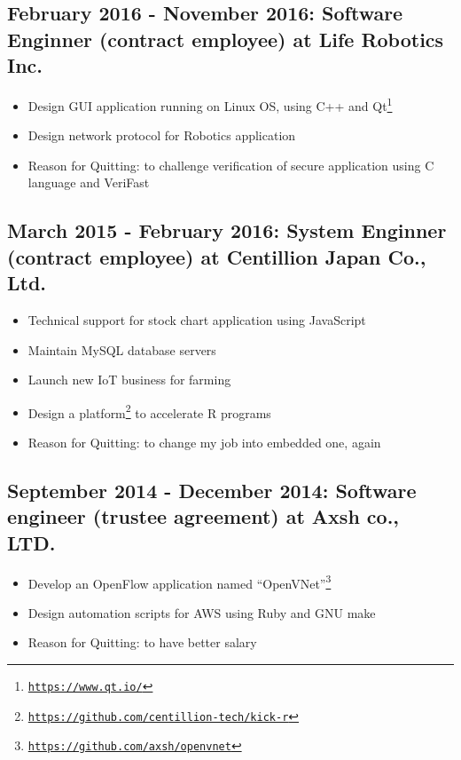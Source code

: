 \documentclass[letterpaper]{article}
\begin{document}
\subsection*{February 2016 - November 2016: Software Enginner (contract employee) at Life Robotics Inc.}

\begin{itemize}
  \item Design GUI application running on Linux OS, using C++ and Qt\footnote{\href{https://www.qt.io/}{\tt https://www.qt.io/}}
  \item Design network protocol for Robotics application
  \item Reason for Quitting: to challenge verification of secure application using C language and VeriFast
\end{itemize}

\subsection*{March 2015 - February 2016: System Enginner (contract employee) at Centillion Japan Co., Ltd.}

\begin{itemize}
  \item Technical support for stock chart application using JavaScript
  \item Maintain MySQL database servers
  \item Launch new IoT business for farming
  \item Design a platform\footnote{\href{https://github.com/centillion-tech/kick-r}{\tt https://github.com/centillion-tech/kick-r}} to accelerate R programs
  \item Reason for Quitting: to change my job into embedded one, again
\end{itemize}

\subsection*{September 2014 - December 2014: Software engineer (trustee agreement) at Axsh co., LTD.}

\begin{itemize}
  \item Develop an OpenFlow application named ``OpenVNet''\footnote{\href{https://github.com/axsh/openvnet}{\tt https://github.com/axsh/openvnet}}
  \item Design automation scripts for AWS using Ruby and GNU make
  \item Reason for Quitting: to have better salary
\end{itemize}
\end{document}
